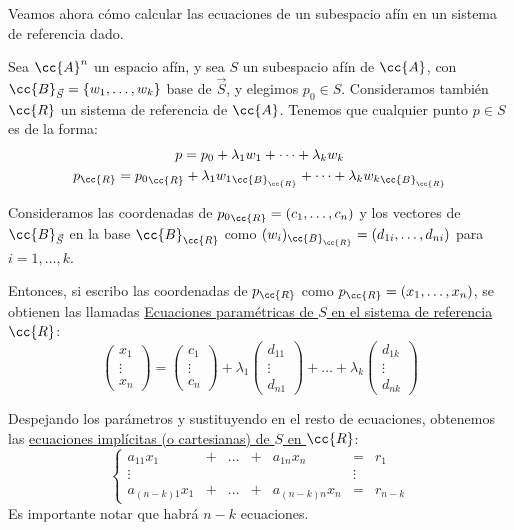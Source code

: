 Veamos ahora cómo calcular las ecuaciones de un subespacio afín en un sistema de referencia dado.

Sea $\cc{A}^n$ un espacio afín, y sea $S$ un subespacio afín de $\cc{A}$, con $\cc{B}_{\vec{S}}=\{w_1,\dots,w_k\}$ base de $\vec{S}$, y elegimos $p_0\in S$. Consideramos también $\cc{R}$ un sistema de referencia de $\cc{A}$. Tenemos que cualquier punto $p\in S$ es de la forma:
\begin{gather*}
    p=p_0+\lambda_1w_1+\dots + \lambda_kw_k\\
    p_{\cc{R}}={p_0}_{\cc{R}} + \lambda_1{w_1}_{\cc{B}_{\cc{R}}} + \dots + \lambda_k{w_k}_{\cc{B}_{\cc{R}}}
\end{gather*}

Consideramos las coordenadas de ${p_0}_{\cc{R}}=(c_1,\dots,c_n)$ y los vectores de $\cc{B}_{\vec{S}}$ en la base $\cc{B}_{\cc{R}}$ como $(w_i)_{\cc{B}_{\cc{R}}}=(d_{1i},\dots, d_{ni})$ para $i=1,\dots,k$. 

Entonces, si escribo las coordenadas de $p_{\cc{R}}$ como $p_{\cc{R}}=(x_1,\dots, x_n)$, se obtienen las llamadas \ul{Ecuaciones paramétricas de $S$ en el sistema de referencia $\cc{R}$}:
\begin{equation*}
    \left(\begin{array}{c}
        x_1 \\ \vdots \\ x_n
    \end{array}\right)
    = \left(\begin{array}{c}
        c_1 \\ \vdots \\ c_n
    \end{array}\right)
    +\lambda_1 \left(\begin{array}{c}
        d_{11} \\ \vdots \\ d_{n1}
    \end{array}\right)
    +\dots
    + \lambda_k \left(\begin{array}{c}
        d_{1k} \\ \vdots \\ d_{nk}
    \end{array}\right)
\end{equation*}


Despejando los parámetros y sustituyendo en el resto de ecuaciones, obtenemos las \ul{ecuaciones implícitas (o cartesianas) de $S$ en $\cc{R}$}:
\begin{equation*}
    \left\{
    \begin{array}{rcccrcl}
        a_{11}x_1 & + & \dots & + & a_{1n}x_n & = & r_1 \\
        \vdots&&&&& \vdots \\
        a_{(n-k)1}x_1 & + & \dots & + & a_{(n-k)n}x_n & = & r_{n-k}
    \end{array}
    \right.
\end{equation*}
Es importante notar que habrá $n-k$ ecuaciones.


